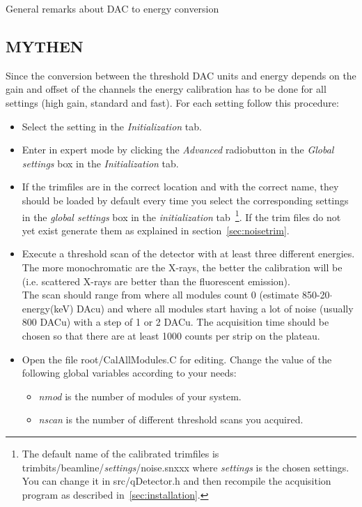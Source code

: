 General remarks about DAC to energy conversion

\subsection{MYTHEN}

Since the conversion between the threshold DAC units and energy depends on the gain and offset of the channels the energy calibration has to be done for all settings (high gain, standard and fast). For each setting follow this procedure:
\begin{itemize}
\item Select the setting in the \textit{Initialization} tab.
\item Enter in expert mode by clicking the \textit{Advanced} radiobutton in the \textit{Global settings} box in the \textit{Initialization} tab.
\item If the trimfiles are in the correct location and with the correct name, they should be loaded by default every time you select the corresponding settings in the \textit{global settings} box in the \textit{initialization} tab~\footnote{The default name of the calibrated trimfiles is \textsf{trimbits/beamline/}\textit{settings}\textsf{/noise.snxxx} where  \textit{settings} is the chosen settings. You  can change it in \textsf{src/qDetector.h} and then recompile the acquisition program as described in~\ref{sec:installation}.}.
If the trim files do not yet exist generate them as explained in section~\ref{sec:noisetrim}.
\item Execute a threshold scan of the detector with at least three different energies. The more monochromatic are the X-rays, the better the calibration will be (i.e. scattered X-rays are better than the fluorescent emission). \\
The scan should range from where all modules count 0 (estimate 850-20$\cdot$energy(keV) DAcu) and where all modules start having a lot of noise (usually 800 DACu) with a step of 1 or 2 DACu. The acquisition time should be chosen so that there are at least 1000 counts per strip on the plateau.
\item Open the file \textsf{root/CalAllModules.C} for editing. Change the value of the following global variables according to your needs:
\begin{itemize}
\item \textit{nmod} is the number of modules of your system.
\item \textit{nscan} is the number of different threshold scans you acquired.

\end{itemize}
\end{itemize}
